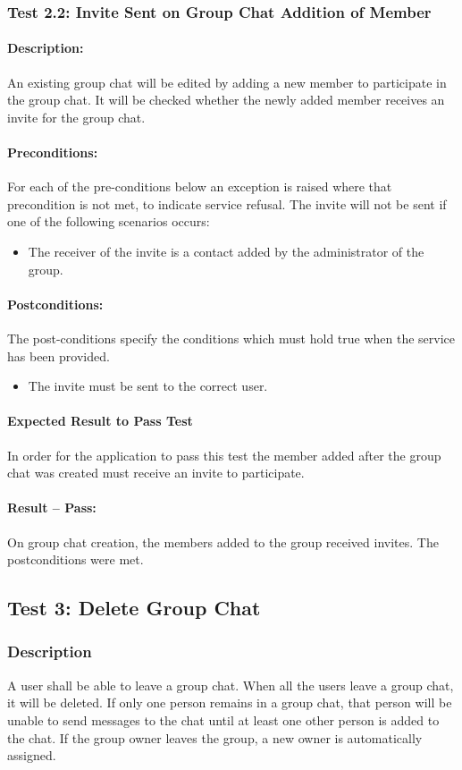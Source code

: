 \documentclass[11pt]{article}
\begin{document}
\subsubsection{Test 2.2: Invite Sent on Group Chat Addition of Member}
\paragraph{Description:}
 An existing group chat will be edited by adding a new member to participate in the group chat. It will be checked whether the newly added member receives an invite for the group chat.
  \paragraph{Preconditions:} For each of the pre-conditions below an exception is raised where that precondition is not met, to indicate service refusal.
  The invite will not be sent if one of the following scenarios occurs:
  \begin{itemize}
  \item The receiver of the invite is a contact added by the administrator of the group.
  \end{itemize}
  \paragraph{Postconditions:} The post-conditions specify the conditions which must hold true when the service has been provided.
  \begin{itemize}
  \item The invite must be sent to the correct user.
  \end{itemize}
\paragraph{Expected Result to Pass Test}
In order for the application to pass this test the member added after the group chat was created must receive an invite to participate.
\paragraph{Result -- Pass:}
On group chat creation, the members added to the group received invites. The postconditions were met.
\subsection{Test 3: Delete Group Chat}
\subsubsection{Description}
A user shall be able to leave a group chat. When all the users leave a group chat, it will be deleted. If only one person remains in a group chat, that person will be unable to send messages to the chat until at least one other person is added to the chat. If the group owner leaves the group, a new owner is automatically assigned.
\end{document}
